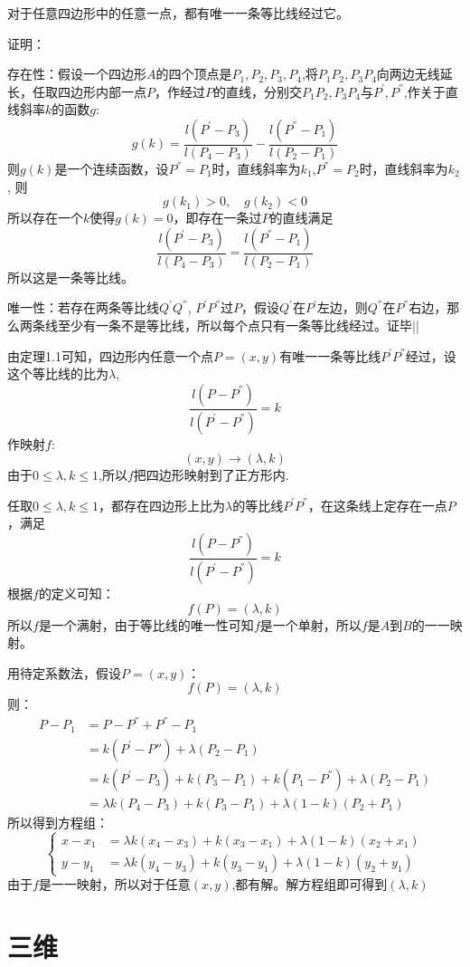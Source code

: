 \documentclass[12pt,a4paper]{article}
\begin{document}
\begin{theorem}
对于任意四边形中的任意一点，都有唯一一条等比线经过它。
\end{theorem}


证明：

存在性：假设一个四边形$A$的四个顶点是$P_1,P_2,P_3,P_4$,将$P_1P_2,P_3P_4$向两边无线延长，任取四边形内部一点$P$，作经过$P$的直线，分别交$P_1P_2,P_3P_4$与$P^{'},P^{''}$,作关于直线斜率$k$的函数$g$:
$$
g(k)=\frac{l(P^{'}-P_3)}{l(P_4-P_3)} -\frac{l(P^{''}-P_1)}{l(P_2-P_1)}
$$
则$g(k)$是一个连续函数，设$P^{''}=P_1$时，直线斜率为$k_1$,$P^{''}=P_2$时，直线斜率为$k_2$,
则
$$
g(k_1)>0,\quad g(k_2)<0
$$
所以存在一个$k$使得$g(k)=0$，即存在一条过$P$的直线满足
$$
\frac{l(P^{'}-P_3)}{l(P_4-P_3)} =\frac{l(P^{''}-P_1)}{l(P_2-P_1)}
$$所以这是一条等比线。

唯一性：若存在两条等比线$Q^{'}Q^{''}$, $P^{'}P^{''}$过$P$，假设$Q^{'}$在$P^{'}$左边，则$Q^{''}$在$P^{''}$右边，那么两条线至少有一条不是等比线，所以每个点只有一条等比线经过。证毕||

由定理1.1可知，四边形内任意一个点$P=(x,y)$有唯一一条等比线$P^{'}P^{''}$经过，设这个等比线的比为$\lambda$,
$$
\frac{l(P-P^{''})}{l(P^{'}-P^{''})}=k
$$
作映射$f$:
$$
(x,y)\to (\lambda,k)
$$
由于$0\le \lambda,k \le 1$,所以$f$把四边形映射到了正方形内.

任取$0\le \lambda,k \le 1$，都存在四边形上比为$\lambda$的等比线$P^{'}P^{''}$，在这条线上定存在一点$P$，满足
$$
\frac{l(P-P^{''})}{l(P^{'}-P^{''})}=k
$$
根据$f$的定义可知：
$$
f(P)=(\lambda,k)
$$
所以$f$是一个满射，由于等比线的唯一性可知$f$是一个单射，所以$f$是$A$到$B$的一一映射。

用待定系数法，假设$P=(x,y)$：
$$
f(P)=(\lambda,k)
$$
则：
\begin{align*}
P-P_1&=P-P^{''}+P^{''}-P_1\\
&=k(P^{'}-P{''})+\lambda(P_2-P_1)\\
&=k(P^{'}-P_3)+k(P_3-P_1)+k(P_1-P^{''})+\lambda(P_2-P_1)\\
&=\lambda k(P_4-P_3)+k(P_3-P_1)+\lambda(1-k)(P_2+P_1)
\end{align*}
所以得到方程组：
$$
\begin{cases}
x-x_1&=\lambda k(x_4-x_3)+k(x_3-x_1)+\lambda(1-k)(x_2+x_1)\\
y-y_1&=\lambda k(y_4-y_3)+k(y_3-y_1)+\lambda(1-k)(y_2+y_1)
\end{cases}
$$
由于$f$是一一映射，所以对于任意$(x,y)$,都有解。解方程组即可得到$(\lambda,k)$
\section{ 三维}
\end{document}
